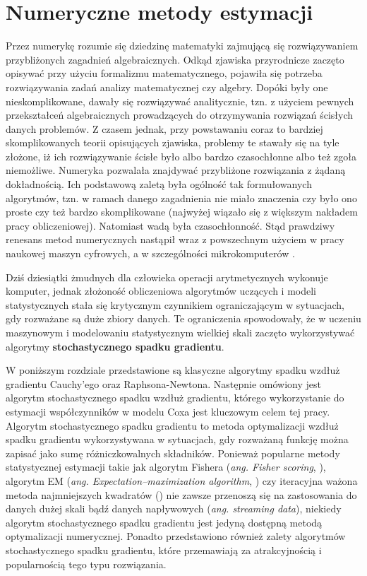 \chapter{Numeryczne metody estymacji}\label{numPAJ}

Przez numerykę rozumie się dziedzinę matematyki
zajmującą się rozwiązywaniem przybliżonych zagadnień algebraicznych. Odkąd zjawiska przyrodnicze zaczęto opisywać przy użyciu formalizmu matematycznego,
pojawiła się potrzeba rozwiązywania zadań analizy matematycznej czy algebry. Dopóki były
one nieskomplikowane, dawały się rozwiązywać analitycznie, tzn. z użyciem pewnych
przekształceń algebraicznych prowadzących do otrzymywania rozwiązań ścisłych danych
problemów. Z czasem jednak, przy powstawaniu coraz to bardziej skomplikowanych teorii
opisujących zjawiska, problemy te stawały się na tyle złożone, iż ich rozwiązywanie ścisłe
było albo bardzo czasochłonne albo też zgoła niemożliwe. Numeryka pozwalała znajdywać
przybliżone rozwiązania z żądaną dokładnością. Ich podstawową zaletą była ogólność tak
formułowanych algorytmów, tzn. w ramach danego zagadnienia nie miało znaczenia czy było
ono proste czy też bardzo skomplikowane (najwyżej wiązało się z większym nakładem pracy
obliczeniowej). Natomiast wadą była czasochłonność. Stąd prawdziwy renesans metod
numerycznych nastąpił wraz z powszechnym użyciem w pracy naukowej maszyn cyfrowych,
a w szczególności mikrokomputerów \cite{milewski}. 

Dziś dziesiątki żmudnych dla człowieka operacji
arytmetycznych wykonuje komputer, jednak złożoność obliczeniowa algorytmów uczących i modeli statystycznych stała się krytycznym czynnikiem ograniczającym w sytuacjach, gdy rozważane są duże zbiory danych. Te ograniczenia spowodowały, że w uczeniu maszynowym i modelowaniu statystycznym wielkiej skali zaczęto wykorzystywać algorytmy \textbf{stochastycznego spadku gradientu}. 

W poniższym rozdziale przedstawione są klasyczne algorytmy spadku wzdłuż gradientu Cauchy'ego oraz Raphsona-Newtona. Następnie omówiony jest algorytm stochastycznego spadku wzdłuż gradientu, którego wykorzystanie do estymacji współczynników w modelu Coxa jest kluczowym celem tej pracy. Algorytm stochastycznego spadku gradientu to metoda optymalizacji wzdłuż spadku gradientu wykorzystywana w sytuacjach, gdy rozważaną funkcję można zapisać jako sumę różniczkowalnych składników. Ponieważ popularne metody statystycznej estymacji takie jak algorytm Fishera (\textit{ang. Fisher scoring}, \cite{fisher3}), algorytm EM (\textit{ang. Expectation–maximization algorithm}, \cite{dempster}) czy iteracyjna ważona metoda najmniejszych kwadratów (\cite{greenPJ}) nie zawsze przenoszą się na zastosowania do danych dużej skali bądź danych napływowych (\textit{ang. streaming data}), niekiedy algorytm stochastycznego spadku gradientu jest jedyną dostępną metodą optymalizacji numerycznej. Ponadto przedstawiono również zalety algorytmów stochastycznego spadku gradientu, które przemawiają za atrakcyjnością i popularnością tego typu rozwiązania. 

